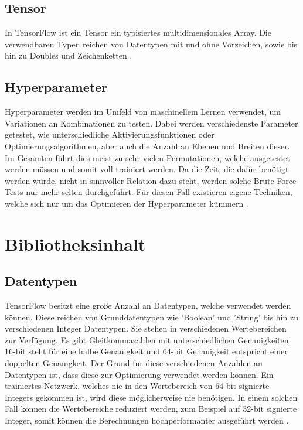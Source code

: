 \subsection{Tensor}

In TensorFlow ist ein Tensor ein typisiertes multidimensionales Array. 
Die verwendbaren Typen reichen von Datentypen mit und ohne Vorzeichen, sowie bis hin zu Doubles und Zeichenketten  \cite{wp2015tensorflow}. 

\subsection{Hyperparameter} 

Hyperparameter werden im Umfeld von maschinellem Lernen verwendet, um Variationen an Kombinationen zu testen. 
Dabei werden verschiedenste Parameter getestet, wie unterschiedliche Aktivierungsfunktionen oder Optimierungsalgorithmen, aber auch die Anzahl an Ebenen und Breiten dieser. 
Im Gesamten führt dies meist zu sehr vielen Permutationen, welche ausgetestet werden müssen und somit voll trainiert werden. 
Da die Zeit, die dafür benötigt werden würde, nicht in sinnvoller Relation dazu steht, werden solche Brute-Force Tests nur mehr selten durchgeführt. 
Für diesen Fall existieren eigene Techniken, welche sich nur um das Optimieren der Hyperparameter kümmern \cite{bishop2006pattern}. 

\section{Bibliotheksinhalt}

\subsection{Datentypen}

TensorFlow besitzt eine große Anzahl an Datentypen, welche verwendet werden können. 
Diese reichen von Grunddatentypen wie 'Boolean' und 'String' bis hin zu verschiedenen Integer Datentypen. 
Sie stehen in verschiedenen Wertebereichen zur Verfügung. 
Es gibt Gleitkommazahlen mit unterschiedlichen Genauigkeiten. 16-bit steht für eine halbe Genauigkeit und 64-bit Genauigkeit entspricht einer doppelten Genauigkeit.
Der Grund für diese verschiedenen Anzahlen an Datentypen ist, dass diese zur Optimierung verwendet werden können. 
Ein trainiertes Netzwerk, welches nie in den Wertebereich von 64-bit signierte Integers gekommen ist, wird diese möglicherweise nie benötigen. 
In einem solchen Fall können die Wertebereiche reduziert werden, zum Beispiel auf 32-bit signierte Integer, somit können die Berechnungen hochperformanter ausgeführt werden \cite{TensorFlow}. 

